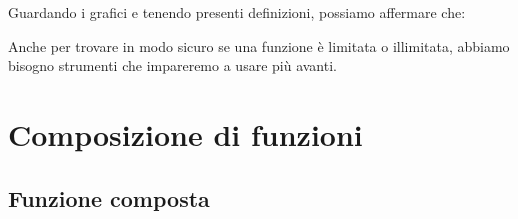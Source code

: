 \begin{esempio}
Guardando i grafici e tenendo presenti definizioni, possiamo affermare che:

\vspace{1em}

\vspace{1.5em}
\end{esempio}

\begin{osservazione}
Anche per trovare in modo sicuro se una funzione è limitata o illimitata, 
abbiamo bisogno strumenti che impareremo a usare più avanti.
\end{osservazione}


\section{Composizione di funzioni}

\subsection{Funzione composta}

